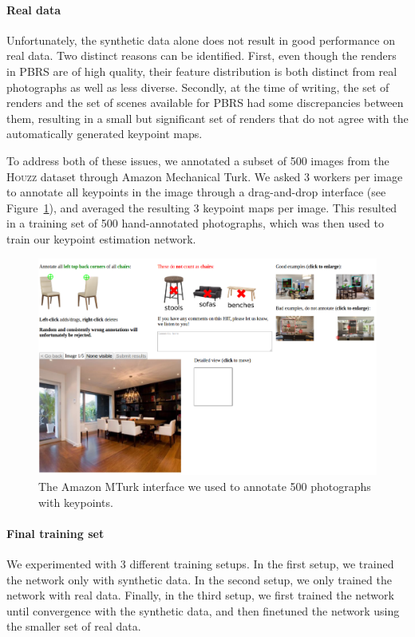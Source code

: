 \documentclass[10pt,twocolumn,letterpaper]{article}
\begin{document}
\paragraph{Real data}
Unfortunately, the synthetic data alone does not result in good performance on
real data. Two distinct reasons can be identified. First, even though the renders
in \textsc{PBRS} are of high quality, their feature distribution is both
distinct from real photographs as well as less diverse. Secondly, at the time
of writing, the set of renders and the set of scenes available for
\textsc{PBRS} had some discrepancies between them, resulting in a small but
significant set of renders that do not agree with the automatically generated
keypoint maps.

To address both of these issues, we annotated a subset of 500 images from the
\textsc{Houzz} dataset through Amazon Mechanical Turk. We asked 3 workers per
image to annotate all keypoints in the image through a drag-and-drop interface
(see Figure~\ref{fig:ch4:amt}), and averaged the resulting 3 keypoint maps per
image.  This resulted in a training set of 500 hand-annotated photographs, which
was then used to train our keypoint estimation network.

\begin{figure}
    \includegraphics[width=\linewidth]{figures/amt/amt}
    \caption[MTurk interface]{The Amazon MTurk interface we used to annotate 500 photographs with keypoints.}
    \label{fig:ch4:amt}
\end{figure}

\paragraph{Final training set} We experimented with 3 different training setups.
In the first setup, we trained the network only with synthetic data. In the second setup,
we only trained the network with real data. Finally, in the third setup, we 
first trained the network until convergence with the synthetic data,
and then finetuned the network using the smaller set of real data.
\end{document}
